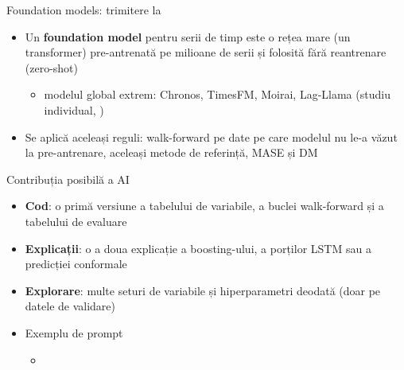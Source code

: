 \begin{frame}{Foundation models: trimitere la }
\itemsize{\small}
\begin{itemize}
    \item Un \textbf{foundation model} pentru serii de timp este o rețea mare (un transformer) pre-antrenată pe milioane de serii și folosită fără reantrenare (zero-shot)
    \begin{itemize}
        \item modelul global extrem: Chronos, TimesFM, Moirai, Lag-Llama (studiu individual, )
    \end{itemize}
    \item Se aplică aceleași reguli: walk-forward pe date pe care modelul nu le-a văzut la pre-antrenare, aceleași metode de referință, MASE și DM
\end{itemize}
\end{frame}

\begin{frame}{Contribuția posibilă a AI}
\itemsize{\small}
\begin{itemize}
    \item \textbf{Cod}: o primă versiune a tabelului de variabile, a buclei walk-forward și a tabelului de evaluare
    \item \textbf{Explicații}: o a doua explicație a boosting-ului, a porților LSTM sau a predicției conformale
    \item \textbf{Explorare}: multe seturi de variabile și hiperparametri deodată (doar pe datele de validare)
    \item Exemplu de prompt
    \begin{itemize}
        \item {}
    \end{itemize}
\end{itemize}
\end{frame}

